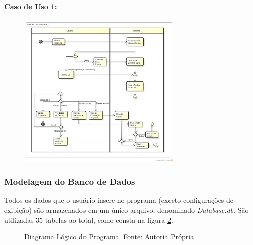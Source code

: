 \documentclass{subfiles}
\begin{document}
			\paragraph{ Caso de Uso 1:}

			\begin{figure}[h!]
				\centering
				\includegraphics[width=0.7\textwidth]{Atividades.jpeg}
				\label{fig:act1}
			\end{figure}

		\subsubsection{Modelagem do Banco de Dados}
			\par Todos os dados que o usuário insere no programa (exceto configurações de exibição) são armazenados em um único arquivo, denominado \textit{Database.db}. São utilizadas 35 tabelas ao total, como consta na figura \ref{fig:logico}.

			\begin{figure}[h	]
				\centering
				\caption{Diagrama Lógico do Programa. Fonte: Autoria Própria}
				\label{fig:logico}
			\end{figure}

			\lipsum[1]

\end{document}
